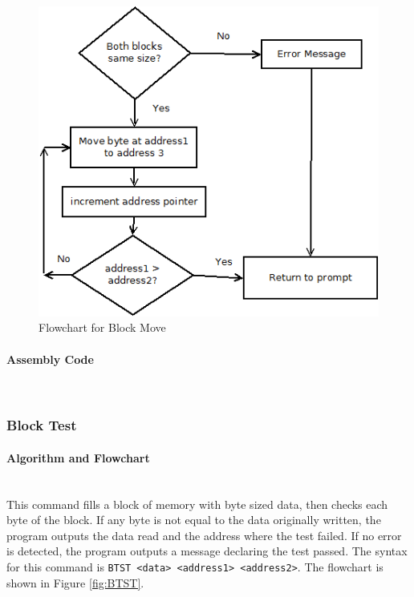 \documentclass[12pt]{article}
\begin{document}
\begin{figure}[H]
\centering
\includegraphics[width=0.7\linewidth]{BMOV}
\caption{Flowchart for Block Move}
\label{fig:BMOV}
\end{figure}
			\paragraph{Assembly Code}~\\				%
			
			\subsubsection{Block Test}
			\paragraph{Algorithm and Flowchart}~\\
			This command fills a block of memory with byte sized data, then checks each byte of the block. If any byte is not equal to the data originally written, the program outputs the data read and the address where the test failed. If no error is detected, the program outputs a message declaring the test passed. The syntax for this command is \texttt{BTST <data> <address1> <address2>}. The flowchart is shown in Figure \ref{fig:BTST}.
			
\end{document}
